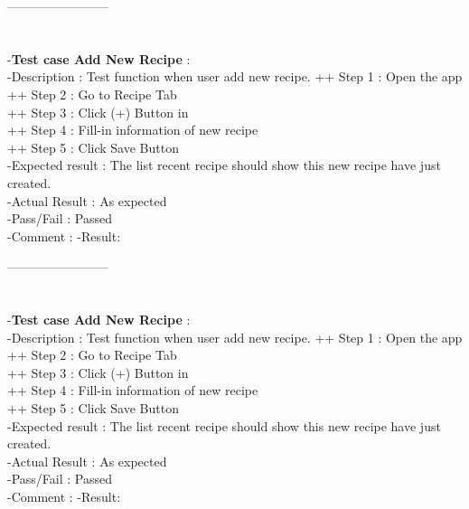 \documentclass{article}
\begin{document}
        ------------------------\\ \\ \\
        -\textbf{Test case Add New Recipe }: \\
        -Description : Test function when user add new recipe.
        ++ Step 1 : Open the app  \\
        ++ Step 2 : Go to Recipe Tab \\
        ++ Step 3 : Click (+) Button in  \\
        ++ Step 4 : Fill-in information of new recipe \\
        ++ Step 5 : Click Save Button \\
        -Expected result : The list recent recipe should show this new recipe have just created. \\
        -Actual Result : As expected \\
        -Pass/Fail : Passed \\
        -Comment : 
        -Result:
        

        ------------------------\\ \\ \\
        -\textbf{Test case Add New Recipe }: \\
        -Description : Test function when user add new recipe.
        ++ Step 1 : Open the app  \\
        ++ Step 2 : Go to Recipe Tab \\
        ++ Step 3 : Click (+) Button in  \\
        ++ Step 4 : Fill-in information of new recipe \\
        ++ Step 5 : Click Save Button \\
        -Expected result : The list recent recipe should show this new recipe have just created. \\
        -Actual Result : As expected \\
        -Pass/Fail : Passed \\
        -Comment : 
        -Result:
       
\end{document}
